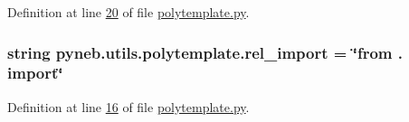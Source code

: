 Definition at line \hyperlink{polytemplate_8py_source_l00020}{20} of file \hyperlink{polytemplate_8py_source}{polytemplate.\-py}.

\hypertarget{namespacepyneb_1_1utils_1_1polytemplate_af687173fec33101d65eb86ef900d1ae8}{
\subsubsection[{rel\-\_\-import}]{\setlength{\rightskip}{0pt plus 5cm}string pyneb.\-utils.\-polytemplate.\-rel\-\_\-import = \char`\"{}from . import\char`\"{}}}\label{namespacepyneb_1_1utils_1_1polytemplate_af687173fec33101d65eb86ef900d1ae8}


Definition at line \hyperlink{polytemplate_8py_source_l00016}{16} of file \hyperlink{polytemplate_8py_source}{polytemplate.\-py}.

